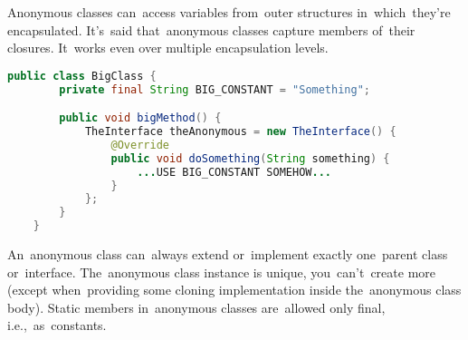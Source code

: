 \noindent Anonymous classes can~access variables from~outer structures in~which~they're encapsulated.
It's~said that~anonymous classes capture members of~their closures.
It~works even over multiple encapsulation levels.
\newpage

\begin{lstlisting}[language=Java]
    public class BigClass {
        private final String BIG_CONSTANT = "Something";

        public void bigMethod() {
            TheInterface theAnonymous = new TheInterface() {
                @Override
                public void doSomething(String something) {
                    ...USE BIG_CONSTANT SOMEHOW...
                }
            };
        }
    }
\end{lstlisting}
\newline

\noindent An~anonymous class can~always extend or~implement exactly one~parent class or~interface.
The~anonymous class instance is unique, you~can't~create more (except when~providing some cloning implementation inside the~anonymous class body).
Static members in~anonymous classes are~allowed only final, i.e.,~as~constants.
